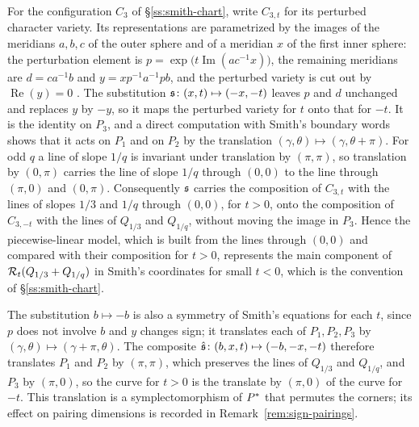 \begin{remark}\label{rem:sign}
For the configuration $C_3$ of \S\ref{ss:smith-chart}, write
$C_{3,t}$ for its perturbed character variety.  Its representations are
parametrized by the images of the meridians $a,b,c$ of the outer sphere and of a meridian $x$ of the
first inner sphere: the perturbation element is $p=\exp\bigl(t\operatorname{Im}(ac^{-1}x)\bigr)$, the
remaining meridians are $d=ca^{-1}b$ and $y=xp^{-1}a^{-1}pb$, and the perturbed variety is cut out by
$\operatorname{Re}(y)=0$ \cite[Prop.~4.1 and (4.1.1)]{Smith}.  The substitution
$\mathfrak{s}\colon(x,t)\mapsto(-x,-t)$ leaves $p$ and $d$ unchanged and replaces $y$ by $-y$, so it maps the
perturbed variety for $t$ onto that for $-t$.  It is the identity on $P_3$, and a direct computation
with Smith's boundary words \cite[Fig.~20]{Smith} shows that it acts on $P_1$ and on $P_2$ by the
translation $(\gamma,\theta)\mapsto(\gamma,\theta+\pi)$.  For odd $q$ a line of slope $1/q$ is
invariant under translation by $(\pi,\pi)$, so translation by $(0,\pi)$ carries the line of slope
$1/q$ through $(0,0)$ to the line through $(\pi,0)$ and $(0,\pi)$.  Consequently $\mathfrak{s}$ carries the
composition of $C_{3,t}$ with the lines of slopes $1/3$ and $1/q$ through $(0,0)$, for $t>0$, onto the
composition of $C_{3,-t}$ with the lines of $Q_{1/3}$ and $Q_{1/q}$, without moving the image in $P_3$.
Hence the piecewise-linear model, which is built from the lines through $(0,0)$ and compared with
their composition for $t>0$, represents the main component of $\mathcal{R}_t(Q_{1/3}+Q_{1/q})$ in Smith's
coordinates for small $t<0$, which is the convention of \S\ref{ss:smith-chart}.

The substitution $b\mapsto-b$ is also a symmetry of Smith's equations for each $t$, since $p$ does not
involve $b$ and $y$ changes sign; it translates each of $P_1,P_2,P_3$ by
$(\gamma,\theta)\mapsto(\gamma+\pi,\theta)$.  The composite $\hat{\mathfrak{s}}\colon(b,x,t)\mapsto(-b,-x,-t)$
therefore translates $P_1$ and $P_2$ by $(\pi,\pi)$, which preserves the lines of $Q_{1/3}$ and
$Q_{1/q}$, and $P_3$ by $(\pi,0)$, so the curve for $t>0$ is the translate by $(\pi,0)$ of the curve
for $-t$.  This translation is a symplectomorphism of $P^{*}$ that permutes the corners; its effect on
pairing dimensions is recorded in Remark~\ref{rem:sign-pairings}.
\end{remark}

